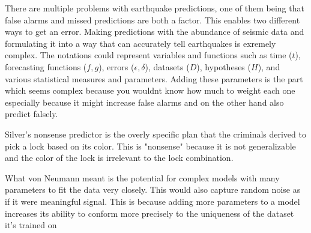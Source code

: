 \documentclass[12pt]{article}
\begin{document}
\begin{enumerate}

There are multiple problems with earthquake predictions, one of them being that false alarms and missed predictions are both a factor. This enables two different ways to get an error. Making predictions with the abundance of seismic data and formulating it into a way that can accurately tell earthquakes is exremely complex. The notations could represent variables and functions such as time (\(t\)), forecasting functions (\(f, g\)), errors (\(\epsilon, \delta\)), datasets (\(D\)), hypotheses (\(H\)), and various statistical measures and parameters. Adding these parameters is the part which seems complex because you wouldnt know how much to weight each one especially because it might increase false alarms and on the other hand also predict falsely.


Silver's nonsense predictor is the overly specific plan that the criminals derived to pick a lock based on its color. This is "nonsense" because it is not generalizable and the color of the lock is irrelevant to the lock combination.


What von Neumann meant is the potential for complex models with many parameters to fit the data very closely. This would also capture random noise as if it were meaningful signal. This is because adding more parameters to a model increases its ability to conform more precisely to the uniqueness of the dataset it's trained on



\end{enumerate}
\end{document}
